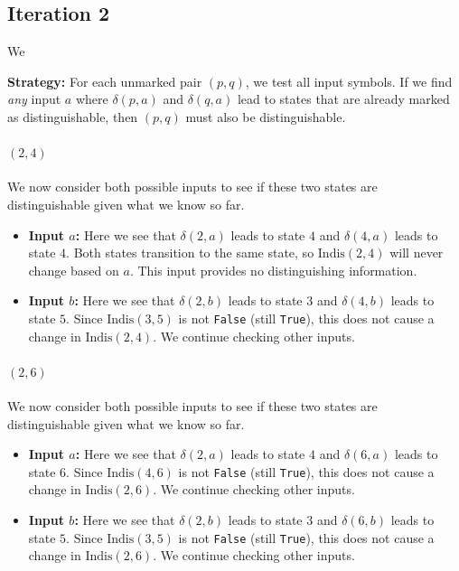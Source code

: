 \documentclass{article}
\begin{document}
\clearpage
\subsection*{Iteration 2}

We

\textbf{Strategy:} For each unmarked pair $(p, q)$, we test all input symbols. If we find \emph{any} input $a$ where $\delta(p, a)$ and $\delta(q, a)$ lead to states that are already marked as distinguishable, then $(p, q)$ must also be distinguishable.
\paragraph{$(2, 4)$} We now consider both possible inputs to see if these two states are distinguishable given what we know so far.
\begin{itemize}[itemsep=0.3em]
\item \textbf{Input $a$:} Here we see that $\delta(2, a)$ leads to state $4$ and $\delta(4, a)$ leads to state $4$.
  Both states transition to the same state, so $\text{Indis}(2, 4)$ will never change based on $a$. This input provides no distinguishing information.
\item \textbf{Input $b$:} Here we see that $\delta(2, b)$ leads to state $3$ and $\delta(4, b)$ leads to state $5$.
  Since $\text{Indis}(3, 5)$ is not \texttt{False} (still \texttt{True}), this does not cause a change in $\text{Indis}(2, 4)$. We continue checking other inputs.
\end{itemize}
\paragraph{$(2, 6)$} We now consider both possible inputs to see if these two states are distinguishable given what we know so far.
\begin{itemize}[itemsep=0.3em]
\item \textbf{Input $a$:} Here we see that $\delta(2, a)$ leads to state $4$ and $\delta(6, a)$ leads to state $6$.
  Since $\text{Indis}(4, 6)$ is not \texttt{False} (still \texttt{True}), this does not cause a change in $\text{Indis}(2, 6)$. We continue checking other inputs.
\item \textbf{Input $b$:} Here we see that $\delta(2, b)$ leads to state $3$ and $\delta(6, b)$ leads to state $5$.
  Since $\text{Indis}(3, 5)$ is not \texttt{False} (still \texttt{True}), this does not cause a change in $\text{Indis}(2, 6)$. We continue checking other inputs.
\end{itemize}
\end{document}
